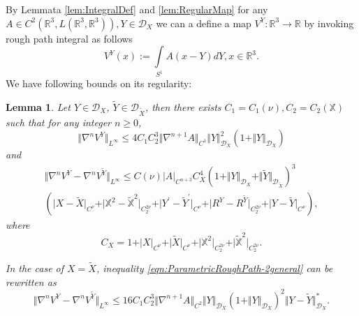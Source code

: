 \documentclass[11pt,a4paper,leqno]{amsart}%
\theoremstyle{plain}
\theoremstyle{remark}
\theoremstyle{plain}
\newtheorem{lemma}[theorem]{Lemma}
\numberwithin{equation}{section}
\def\Rnu{{\mathbb R}}
\def\intl{\int\limits}
\begin{document}
By Lemmata \ref{lem:IntegralDef} and \ref{lem:RegularMap} for any
$A\in C^2(\Rnu^3,L(\Rnu^3,\Rnu^3)),Y\in\mathcal{D}_X$ we can a
define a map  $V^Y:\Rnu^3\to\Rnu$  by invoking rough path integral as follows
\begin{equation}
V^Y(x):=\intl_{S^1}A(x-Y)dY,x\in\Rnu^3.
\end{equation}
We have following bounds on its regularity:
\begin{lemma}\label{lem:ParametricRoughPath}
Let $Y\in \mathcal{D}_X$, $\tilde{Y}\in \mathcal{D}_{\tilde{X}}$,
then there exists $C_1=C_1(\nu),C_2=C_2(\mathbb{X})$ such that for
any integer $n\geq 0$,
\begin{equation}
\Vert \nabla^nV^Y\Vert_{L^{\infty}}\leq
4C_1C_2^3\Vert \nabla^{n+1}A\Vert_{C^1}\Vert Y\Vert_{\mathcal{D}_X}^2(1+\Vert Y\Vert_{\mathcal{D}_X})\label{eqn:ParametricRoughPath-1}
\end{equation}
and
\begin{multline}\label{eqn:ParametricRoughPath-2general}
\Vert \nabla^nV^Y-\nabla^nV^{\tilde{Y}}\Vert_{L^{\infty}}\leq
C(\nu)\vert A\vert_{C^{n+3}}C_X^4(1+\Vert Y\Vert_{\mathcal{D}_X}+\Vert \tilde{Y}\Vert_{\mathcal{D}_{\tilde{X}}})^3\\
(\vert X-\tilde{X}\vert_{C^{\nu}}+\vert \mathbb{X}^2-\mathbb{\tilde{X}}^2\vert_{C_2^{2\nu}}+\vert Y^\prime-\tilde{Y}^\prime\vert_{C^{\nu}}+\vert R^Y-R^{\tilde{Y}}\vert_{C_2^{2\nu}}+\vert Y-\tilde{Y}\vert_{C^{\nu}}),
\end{multline}
where
$$
C_X=1+\vert X\vert_{C^{\nu}}+\vert \tilde{X}\vert_{C^{\nu}}+\vert \mathbb{X}^2\vert_{C_2^{2\nu}}+\vert \mathbb{\tilde{X}}^2\vert_{C_2^{2\nu}}.
$$

In the case of $X=\tilde{X}$, inequality \eqref{eqn:ParametricRoughPath-2general} can be rewritten as
\begin{equation}
\Vert \nabla^nV^Y-\nabla^nV^{\tilde{Y}}\Vert_{L^{\infty}}\leq
16C_1C_2^3\Vert \nabla^{n+1}A\Vert_{C^2}\Vert Y\Vert_{\mathcal{D}_X}(1+\Vert Y\Vert_{\mathcal{D}_X})^2\Vert Y-\tilde{Y}\Vert_{\mathcal{D}_X}^*.
\label{eqn:ParametricRoughPath-2}
\end{equation}
\end{lemma}
\end{document}
